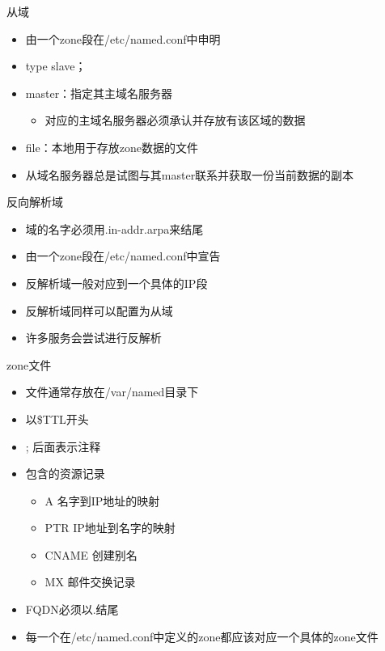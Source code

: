 \begin{frame}{从域}
\begin{itemize}
\item 由一个zone段在/etc/named.conf中申明
\item type slave；
\item master：指定其主域名服务器

\begin{itemize}
\item 对应的主域名服务器必须承认并存放有该区域的数据
\end{itemize}
\item file：本地用于存放zone数据的文件
\item 从域名服务器总是试图与其master联系并获取一份当前数据的副本
\end{itemize}

\end{frame} 
\begin{frame}{反向解析域}


\begin{itemize}
\item 域的名字必须用.in-addr.arpa来结尾
\item 由一个zone段在/etc/named.conf中宣告
\item 反解析域一般对应到一个具体的IP段
\item 反解析域同样可以配置为从域
\item 许多服务会尝试进行反解析
\end{itemize}



\end{frame} 
\begin{frame}{zone文件}
\begin{itemize}
\item 文件通常存放在/var/named目录下
\item 以\$TTL开头
\item ; 后面表示注释
\item 包含的资源记录

\begin{itemize}
\item A 名字到IP地址的映射
\item PTR IP地址到名字的映射
\item CNAME 创建别名
\item MX 邮件交换记录
\end{itemize}
\item FQDN必须以.结尾
\item 每一个在/etc/named.conf中定义的zone都应该对应一个具体的zone文件
\end{itemize}

\end{frame} 
